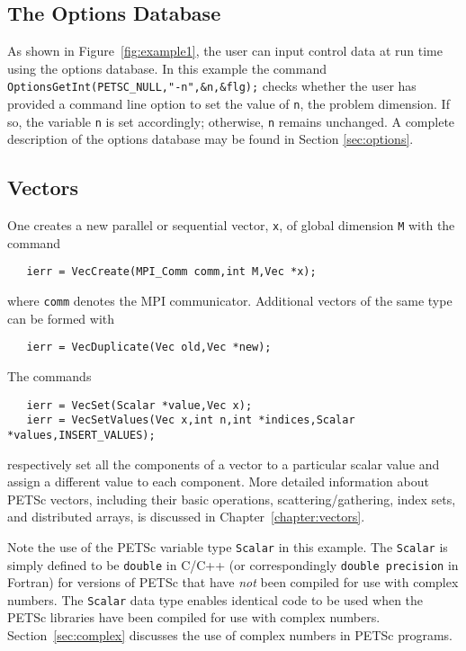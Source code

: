 {\subsection*{The Options Database}

As shown in Figure~\ref{fig:example1}, the user can input control data
at run time using the options database. In this example the command
{\tt OptionsGetInt(PETSC\_NULL,"-n",\&n,\&flg);} checks whether the user has
provided a command line option to set the value of {\tt n}, the
problem dimension.  If so, the variable {\tt n} is set accordingly;
otherwise, {\tt n} remains unchanged. A complete description of the
options database may be found in Section \ref{sec:options}.

\subsection*{Vectors}

One creates a new parallel or 
sequential vector, {\tt x}, of global dimension {\tt M} with the 
command  
\begin{verbatim}
   ierr = VecCreate(MPI_Comm comm,int M,Vec *x);
\end{verbatim}
where {\tt comm} denotes the MPI communicator.
Additional vectors of the same type can be formed with
\begin{verbatim}
   ierr = VecDuplicate(Vec old,Vec *new);
\end{verbatim}
The commands  
\begin{verbatim}
   ierr = VecSet(Scalar *value,Vec x);
   ierr = VecSetValues(Vec x,int n,int *indices,Scalar *values,INSERT_VALUES);
\end{verbatim}
respectively set all the components of a vector to a particular scalar
value and assign a different value to each component.  More
detailed information about PETSc vectors, including their basic
operations, scattering/gathering, index sets, and distributed arrays, is
discussed in Chapter~\ref{chapter:vectors}.

 
Note the use of the PETSc variable type {\tt Scalar} in this example.
The {\tt Scalar} is simply defined to be {\tt double} in C/C++
(or correspondingly {\tt double precision} in Fortran) for versions of
PETSc that have {\em not} been compiled for use with complex numbers.
The {\tt Scalar} data type enables
identical code to be used when the PETSc libraries have been compiled
for use with complex numbers.  Section~\ref{sec:complex} discusses the
use of complex numbers in PETSc programs.

}
